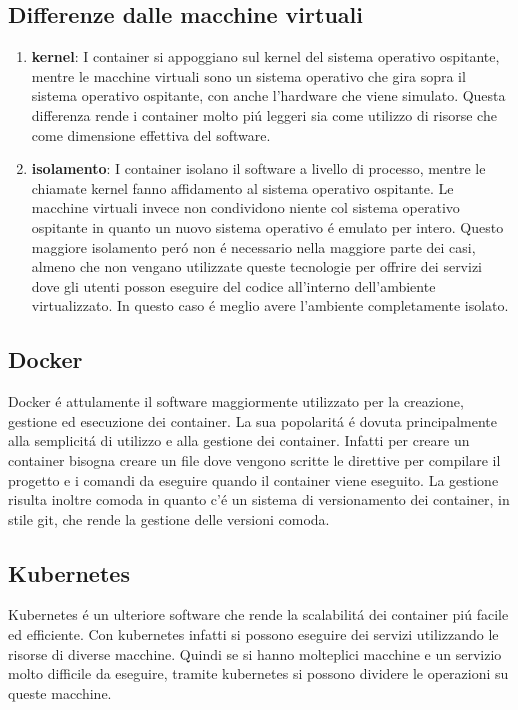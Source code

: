 \subsection{Differenze dalle macchine virtuali}
\begin{enumerate}
  \item \textbf{kernel}: I container si appoggiano sul kernel del sistema operativo ospitante, mentre le macchine virtuali sono un sistema operativo che gira sopra il sistema operativo ospitante, con anche l'hardware che viene simulato. Questa differenza rende i container molto piú leggeri sia come utilizzo di risorse che come dimensione effettiva del software.
  \item \textbf{isolamento}: I container isolano il software a livello di processo, mentre le chiamate kernel fanno affidamento al sistema operativo ospitante. Le macchine virtuali invece non condividono niente col sistema operativo ospitante in quanto un nuovo sistema operativo é emulato per intero. Questo maggiore isolamento peró non é necessario nella maggiore parte dei casi, almeno che non vengano utilizzate queste tecnologie per offrire dei servizi dove gli utenti posson eseguire del codice all'interno dell'ambiente virtualizzato. In questo caso é meglio avere l'ambiente completamente isolato.
\end{enumerate}

\subsection{Docker}
\cite{docker}Docker é attulamente il software maggiormente utilizzato per la creazione, gestione ed esecuzione dei container. La sua popolaritá é dovuta principalmente alla semplicitá di utilizzo e alla gestione dei container. Infatti per creare un container bisogna creare un file dove vengono scritte le direttive per compilare il progetto e i comandi da eseguire quando il container viene eseguito. La gestione risulta inoltre comoda in quanto c'é un sistema di versionamento dei container, in stile git, che rende la gestione delle versioni comoda.

\subsection{Kubernetes}
Kubernetes é un ulteriore software che rende la scalabilitá dei container piú facile ed efficiente. Con kubernetes infatti si possono eseguire dei servizi utilizzando le risorse di diverse macchine. Quindi se si hanno molteplici macchine e un servizio molto difficile da eseguire, tramite kubernetes si possono dividere le operazioni su queste macchine.
